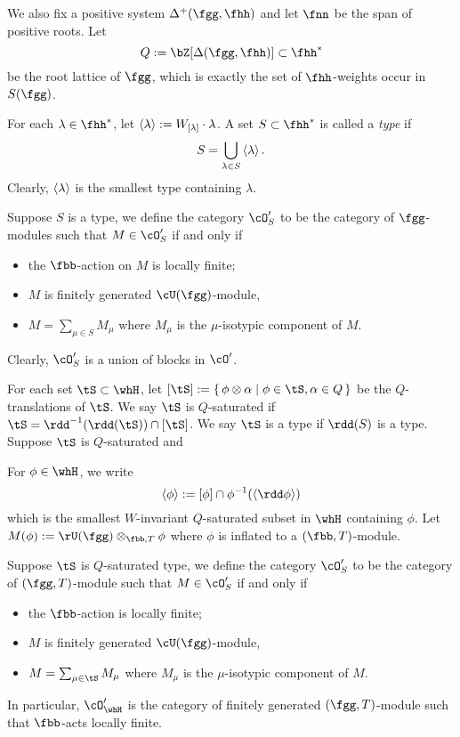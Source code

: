 \documentclass[12pt,a4paper]{amsart}
\numberwithin{equation}{section}
\theoremstyle{remark}
\begin{document}
We also fix a positive system $\Delta^{+}(\fgg,\fhh)$ and let $\fnn$ be the
span of positive roots.
Let
\[
Q:= \bZ[\Delta(\fgg,\fhh)]\subset \fhh^{*}
\]
be the root lattice of $\fgg$, which is exactly the set of $\fhh$-weights occur in $S(\fgg)$.


For each $\lambda\in \fhh^{*}$, let
$\braket{\lambda} := W_{[\lambda]}\cdot \lambda$.
A set $S\subset \fhh^{*}$ is called a \emph{type} if
\[
  S = \bigcup_{\lambda\in S} \braket{\lambda}.
\]
Clearly, $\braket{\lambda}$ is the smallest type containing $\lambda$.


Suppose $S$ is a type,
we define the category $\cO'_{S}$ to be the category of $\fgg$-modules
such that $M\in \cO'_{S}$ if and only if
\begin{itemize}
  \item the $\fbb$-action on $M$ is locally finite;
  \item $M$ is finitely generated $\cU(\fgg)$-module,
  \item $M = \sum_{\mu \in S} M_{\mu}$
        where $M_{\mu}$ is the $\mu$-isotypic component of $M$.
\end{itemize}
Clearly, $\cO'_{S}$ is a union of blocks in $\cO'$.


For each set $\tS\subset \whH$, let
$[\tS] := \set{\phi\otimes \alpha| \phi \in \tS, \alpha\in Q}$ be the
$Q$-translations of $\tS$.
We say $\tS$ is $Q$-saturated if $\tS = \rdd^{{-1}}(\rdd(\tS))\cap [\tS]$.
We say $\tS$ is a type if $\rdd(S)$ is a type.
Suppose $\tS$ is $Q$-saturated and

For $\phi\in \whH$, we write
\[
\braket{\phi}:= [\phi]\cap \phi^{-1}(\braket{\rdd \phi})
\]
which is the smallest $W$-invariant $Q$-saturated subset in $\whH$ containing
$\phi$.
Let $M(\phi) := \rU(\fgg)\otimes_{\fbb,T} \phi$ where $\phi$ is inflated to a
$(\fbb,T)$-module.

Suppose $\tS$ is $Q$-saturated type,
we define the category $\cO'_{S}$ to be the category of $(\fgg,T)$-module
such that $M\in \cO'_{S}$ if and only if
\begin{itemize}
  \item the $\fbb$-action is locally finite;
  \item $M$ is finitely generated $\cU(\fgg)$-module,
  \item $M = \sum_{\mu \in \tS} M_{\mu}$
        where $M_{\mu}$ is the $\mu$-isotypic component of $M$.
\end{itemize}
In particular, $\cO'_{\whH}$ is the category of finitely generated $(\fgg,T)$-module
such that $\fbb$-acts locally finite.
\end{document}
